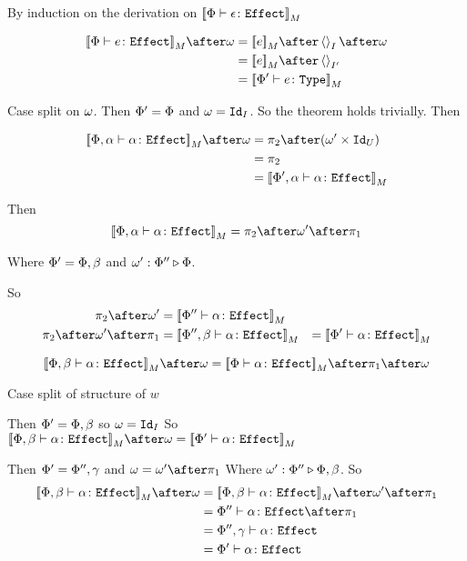 \documentclass{report}
\begin{document}
\proof
By induction on the derivation on $\deno{\typerelation{\P}{\e}{\effect}}$

\begin{align}
    \deno{\typerelation{\P}{e}{\effect}}\after\w & = \deno{e}\after\term{I}\after\w \\
    & = \deno{e}\after\term{I'} \\
    & = \deno{\typerelation{\P'}{e}{\type}}\\
\end{align}

Case split on $\w$.
\subcase{$\w = \i$}
Then $\P' = \P$ and $\w = \Id{I}$. So the theorem holds trivially.
Then

\begin{align}
    \deno{\typerelation{\P,\a}{\a}{\effect}}\after\w &= \pp\after(\w'\times \Id{U}) \\
    & = \pp\\
    & = \deno{\typerelation{\P',\a}{\a}{\effect}}
\end{align}

Then \begin{equation}
    \deno{\typerelation{\P,\a}{\a}{\effect}} = \pp\after\w'\after\p
\end{equation}

Where $\P' = \P,\b$ and $\wrel{\w'}{\P''}{\P}$.

So\begin{align}
    \pp\after\w' & = \deno{\typerelation{\P''}{\a}{\effect}}
    \\
    \pp\after\w'\after\p & =\deno{\typerelation{\P'',\b}{\a}{\effect}}
    &= \deno{\typerelation{\P'}{\a}{\effect}}
\end{align}

\begin{equation}
    \deno{\typerelation{\P,\b}{\a}{\effect}}\after\w = \deno{\typerelation{\P}{\a}{\effect}}\after\p\after\w
\end{equation}

Case split of structure of $w$

\subcase{$\w=\i$}
Then $\P' = \P,\b$ so $\w=\Id{I}$
So $\deno{\typerelation{\P,\b}{\a}{\effect}}\after\w = \deno{\typerelation{\P'}{\a}{\effect}}$

Then $\P' = \P'',\g$ and $\w=\w'\after\p$
Where $\wrel{\w'}{\P''}{\P,\b}$.
So
\begin{align}
    \deno{\typerelation{\P,\b}{\a}{\effect}}\after\w & = \deno{\typerelation{\P,\b}{\a}{\effect}}\after\w'\after\p\\
    & = {\typerelation{\P''}{\a}{\effect}}\after\p\\
    & = {\typerelation{\P'',\g}{\a}{\effect}}\\
    & = {\typerelation{\P'}{\a}{\effect}}\\
\end{align}
\end{document}
